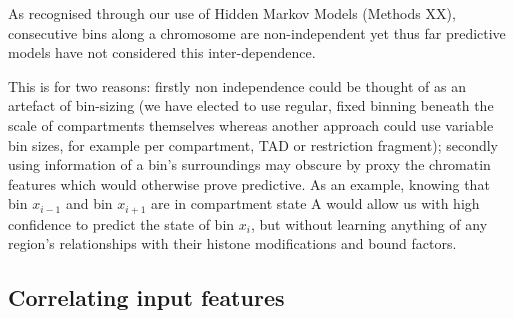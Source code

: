 \documentclass[a4paper,11pt,oneside]{book}
\begin{document}

As recognised through our use of Hidden Markov Models (Methods XX), consecutive bins along a chromosome are non-independent yet thus far predictive models have not considered this inter-dependence. 

This is for two reasons: firstly non independence could be thought of as an artefact of bin-sizing (we have elected to use regular, fixed binning beneath the scale of compartments themselves whereas another approach could use variable bin sizes, for example per compartment, TAD or restriction fragment); secondly using information of a bin's surroundings may obscure by proxy the chromatin features which would otherwise prove predictive. As an example, knowing that bin $x_{i-1}$ and bin $x_{i+1}$ are in compartment state A would allow us with high confidence to predict the state of bin $x_i$, but without learning anything of any region's relationships with their histone modifications and bound factors.

\subsection{Correlating input features}

\ifstandalone
\begin{small}

\end{small}
\fi
\end{document}
